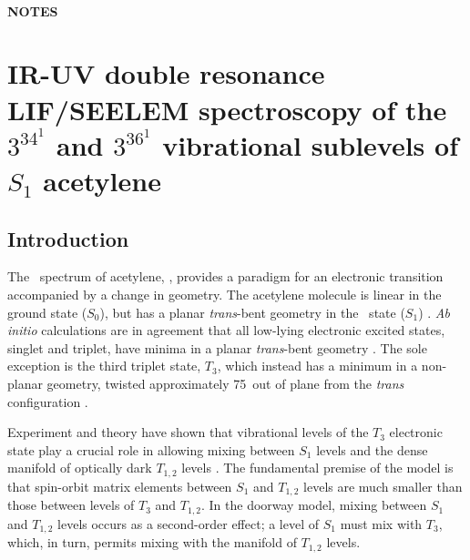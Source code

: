 \documentclass[12pt]{mitthesis}
\begin{document}
\tableofcontents
\clearpage


\subsubsection*{NOTES}
\clearpage

\setcounter{chapter}{5}
\chapter{  IR-UV double resonance LIF/SEELEM spectroscopy of the
  $3^34^1$  and $3^36^1$  vibrational sublevels of $S_1$
  acetylene}

\section{Introduction}

The \AtoX\ spectrum of acetylene, , provides a paradigm for
an electronic transition accompanied by a change in geometry.  The
acetylene molecule is linear in the ground state ($S_0$), but has a
planar \emph{trans}-bent geometry in the \astate\ state ($S_1$)
\cite{king52, ingold53, innes54}.  \emph{Ab initio} calculations are
in agreement that all low-lying electronic excited states, singlet and
triplet, have minima in a planar \emph{trans}-bent geometry
\cite{demoulin75, lischka86, yamaguchi93, sherrill96, malsch98,
  ventura03}.  The sole exception is the third triplet state, $T_3$,
which instead has a minimum in a non-planar geometry, twisted
approximately 75\degrees\ out of plane from the \emph{trans}
configuration \cite{cui96, ventura03, thom07}.

Experiment and theory have shown that vibrational levels of the $T_3$
electronic state play a crucial role in allowing mixing between $S_1$
levels and the dense manifold of optically dark $T_{1,2}$ levels
\cite{humphrey97, altunata00, dupre93, cui97, thom07, ventura03}.  The
fundamental premise of the model is that spin-orbit matrix elements
between $S_1$ and $T_{1,2}$ levels are much smaller than those between
levels of $T_3$ and $T_{1,2}$.  In the doorway model, mixing between
$S_1$ and $T_{1,2}$ levels occurs as a second-order effect; a level
of $S_1$ must mix with $T_3$, which, in turn, permits mixing with the
manifold of $T_{1,2}$ levels.

\end{document}
